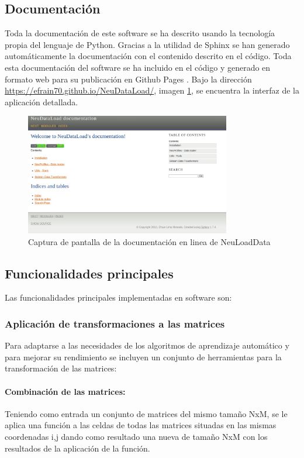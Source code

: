 \subsection{Documentación}
Toda la documentación de este software se ha descrito usando la tecnología propia del lenguaje de Python. Gracias a la utilidad de Sphinx \cite{OverviewDocumentation} se han generado automáticamente la documentación con el contenido descrito en el código. Toda esta documentación del software se ha incluido en el código y generado en formato web para su publicación en Github Pages \cite{GitHubLive.}. Bajo la dirección \url{https://efrain70.github.io/NeuDataLoad/}, imagen \ref{figure:documentacion}, se encuentra la interfaz de la aplicación detallada.

\begin{figure}[H]
\centering
\includegraphics[width=0.8\textwidth]{figs/software/docu.png}
\caption{Captura de pantalla de la documentación en linea de NeuLoadData}
\label{figure:documentacion}
\end{figure}

\subsection{Funcionalidades principales}
Las funcionalidades principales implementadas en software son:

\subsubsection{Aplicación de transformaciones a las matrices}
Para adaptarse a las necesidades de los algoritmos de aprendizaje automático y para mejorar su rendimiento se incluyen un conjunto de herramientas para la transformación de las matrices:

\paragraph{Combinación de las matrices:}
Teniendo como entrada un conjunto de matrices del mismo tamaño NxM, se le aplica una función a las celdas de todas las matrices situadas en las mismas coordenadas i,j dando como resultado una nueva de tamaño NxM con los resultados de la aplicación de la función.


